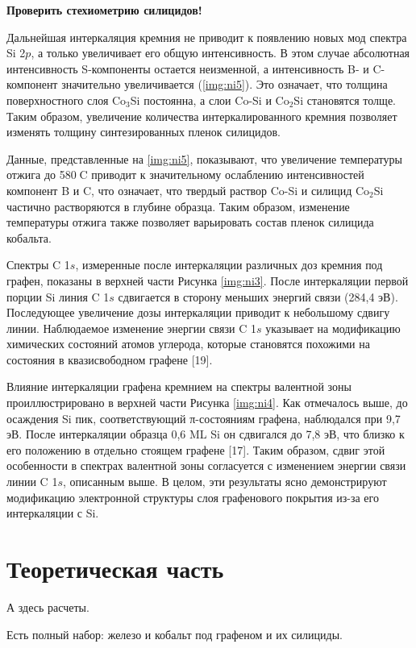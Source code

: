 \textbf{Проверить стехиометрию силицидов!}

Дальнейшая интеркаляция кремния не приводит к появлению новых мод спектра Si 2$p$, а только увеличивает его общую интенсивность. В этом случае абсолютная интенсивность S-компоненты остается неизменной, а интенсивность B- и C-компонент значительно увеличивается (\ref{img:ni5}). Это означает, что толщина поверхностного слоя Co$_3$Si постоянна, а слои Co-Si и Co$_2$Si становятся толще. Таким образом, увеличение количества интеркалированного кремния позволяет изменять толщину синтезированных пленок силицидов.

Данные, представленные на \ref{img:ni5}, показывают, что увеличение температуры отжига до 580C приводит к значительному ослаблению интенсивностей компонент B и C, что означает, что твердый раствор Co-Si и силицид Co$_2$Si частично растворяются в глубине образца. Таким образом, изменение температуры отжига также позволяет варьировать состав пленок силицида кобальта.

Спектры C 1$s$, измеренные после интеркаляции различных доз кремния под графен, показаны в верхней части Рисунка \ref{img:ni3}. После интеркаляции первой порции Si линия C 1$s$ сдвигается в сторону меньших энергий связи (284,4 эВ). Последующее увеличение дозы интеркаляции приводит к небольшому сдвигу линии. Наблюдаемое изменение энергии связи C 1$s$ указывает на модификацию химических состояний атомов углерода, которые становятся похожими на состояния в квазисвободном графене [19].

Влияние интеркаляции графена кремнием на спектры валентной зоны проиллюстрировано в верхней части Рисунка \ref{img:ni4}. Как отмечалось выше, до осаждения Si пик, соответствующий π-состояниям графена, наблюдался при 9,7 эВ. После интеркаляции образца 0,6 ML Si он сдвигался до 7,8 эВ, что близко к его положению в отдельно стоящем графене [17]. Таким образом, сдвиг этой особенности в спектрах валентной зоны согласуется с изменением энергии связи линии C 1$s$, описанным выше. В целом, эти результаты ясно демонстрируют модификацию электронной структуры слоя графенового покрытия из-за его интеркаляции с Si.



\section{Теоретическая часть}\label{sec:ch1/sec1}
А здесь расчеты.

Есть полный набор: железо и кобальт под графеном и их силициды.

